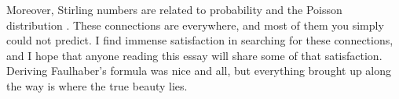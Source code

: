 \documentclass[a4paper]{article}
\theoremstyle{definition}
\begin{document}
Moreover, Stirling numbers are related to probability and the Poisson distribution \cite{ADELL2019335}.
These connections are everywhere, and most of them you simply could not predict.
I find immense satisfaction in searching for these connections, and I hope that anyone reading this essay will share some of that satisfaction.
Deriving Faulhaber's formula was nice and all, but everything brought up along the way is where the true beauty lies.

\printbibliography
\end{document}
